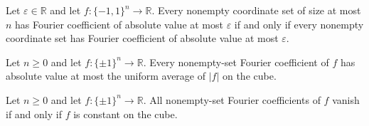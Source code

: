 \begin{theorem}
\label{FABL.isLowDegreeFourierRegular_dimension_iff}
\leanok
{}
Let $\varepsilon\in\mathbb R$ and let $f:\{-1,1\}^n\to\mathbb R$. Every nonempty
coordinate set of size at most $n$ has Fourier coefficient of absolute value at most
$\varepsilon$ if and only if every nonempty coordinate set has Fourier coefficient of
absolute value at most $\varepsilon$.
\end{theorem}

\begin{theorem}
\label{FABL.isFourierRegular_uniformLpNorm_one}
\leanok
{}
Let $n\ge 0$ and let $f:\{\pm1\}^n\to\mathbb R$. Every nonempty-set Fourier coefficient
of $f$ has absolute value at most the uniform average of $|f|$ on the cube.
\end{theorem}

\begin{theorem}
\label{FABL.isFourierRegular_zero_iff_exists_const}
\leanok
{}
Let $n\ge 0$ and let $f:\{\pm1\}^n\to\mathbb R$. All nonempty-set Fourier coefficients
of $f$ vanish if and only if $f$ is constant on the cube.
\end{theorem}
